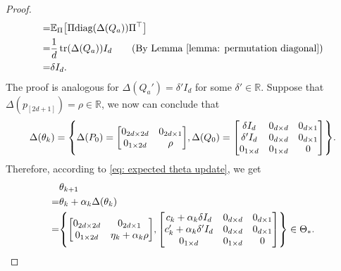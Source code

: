 \documentclass{article}
\newcommand{\explain}[1]{\tag*{(#1)}}
\newcommand{\R}{\mathbb{R}}
\newcommand{\E}{\mathbb{E}}
\newcommand{\diag}{\text{diag}}
\begin{document}
\begin{proof}
\begin{align}
    =& \E_{\Pi} \qty[\Pi \diag\qty(\Delta(Q_a))\Pi^\top] \\
    =& \frac{1}{d}\tr(\Delta(Q_a))I_d\explain{By Lemma~\ref{lemma: permutation diagonal}}\\
    =& \delta I_d.
\end{align}
The proof is analogous for $\Delta(Q_a') = \delta'I_d$ for some $\delta' \in \R$.
Suppose that $\Delta(p_{[2d+1]}) = \rho \in \R$,
we now can conclude that
\begin{align}
    \Delta(\theta_k)
    = \qty{
    \Delta(P_0)  = \mqty[0_{2d\times2d} & 0_{2d\times1}\\
                         0_{1\times2d} & \rho],
    \Delta(Q_0)  = \mqty[\delta I_d & 0_{d \times d} & 0_{d \times 1} \\
                         \delta' I_d & 0_{d \times d} & 0_{d \times 1} \\
                        0_{1 \times d} & 0_{1 \times d} & 0]}.
\end{align}
Therefore, according to \eqref{eq: expected theta update}, we get
\begin{align}
    &\theta_{k+1}\\
    =&\theta_k  + \alpha_k\Delta(\theta_k)\\
    =&\qty{
     \mqty[0_{2d\times2d} & 0_{2d\times1}\\
                         0_{1\times2d} & \eta_k + \alpha_k\rho],
     \mqty[c_k + \alpha_k\delta I_d & 0_{d \times d} & 0_{d \times 1} \\
           c_k' + \alpha_k\delta' I_d & 0_{d \times d} & 0_{d \times 1} \\
           0_{1 \times d} & 0_{1 \times d} & 0]
    }
    \in \Theta_*.
\end{align}
\end{proof}
\end{document}
